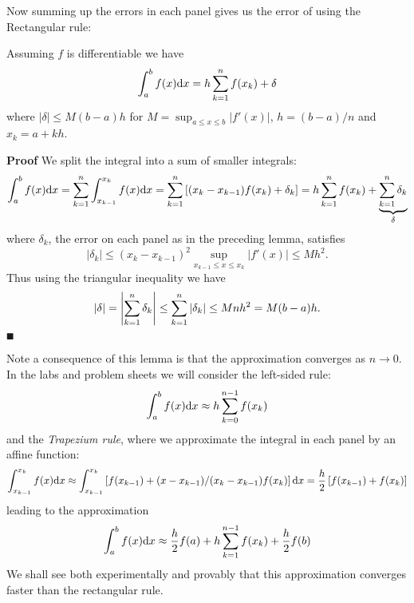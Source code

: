 Now summing up the errors in each panel gives us the error of using the Rectangular rule:

\begin{theorem} Assuming $f$ is differentiable we have
\[
\ensuremath{\int}_a^b f(x) {\rm d}x =  h \ensuremath{\sum}_{k=1}^n f(x_k) +  \ensuremath{\delta}
\]
where $|\ensuremath{\delta}| \ensuremath{\leq} M (b-a) h$ for $M = \sup_{a \ensuremath{\leq} x \ensuremath{\leq} b}|f'(x)|$, $h = (b-a)/n$ and $x_k = a + kh$. 

\end{theorem}
\textbf{Proof} We split the integral into a sum of smaller integrals:
\[
\ensuremath{\int}_a^b f(x) {\rm d}x = \ensuremath{\sum}_{k=1}^n  \ensuremath{\int}_{x_{k-1}}^{x_k} f(x) {\rm d}x =
\ensuremath{\sum}_{k=1}^n  \br[(x_k - x_{k-1}) f(x_k) + \ensuremath{\delta}_k] =  h \ensuremath{\sum}_{k=1}^n f(x_k) +  \underbrace{\ensuremath{\sum}_{k=1}^n \ensuremath{\delta}_k}_\ensuremath{\delta}
\]
where $\ensuremath{\delta}_k$, the error on each panel as in the preceding lemma, satisfies 
\[
|\ensuremath{\delta}_k| \ensuremath{\leq} (x_k-x_{k-1})^2 \sup_{x_{k-1} \ensuremath{\leq} x \ensuremath{\leq} x_k}|f'(x)| \ensuremath{\leq} M h^2.
\]
Thus using the triangular inequality we have 
\[
|\delta| = \left|{ \sum_{k=1}^n \delta_k}\right| \leq \sum_{k=1}^n |\delta_k| \leq M n h^2 = M(b-a)h.
\]
\ensuremath{\QED}

Note a consequence of this lemma is that the approximation converges as $n \ensuremath{\rightarrow} 0$. In the labs and problem sheets we will consider the left-sided rule:
\[
\ensuremath{\int}_a^b f(x) {\rm d}x \ensuremath{\approx}  h \ensuremath{\sum}_{k=0}^{n-1} f(x_k)
\]
and the \emph{Trapezium rule}, where we approximate the integral in each panel by an affine function:
\[
\ensuremath{\int}_{x_{k-1}}^{x_k} f(x) {\rm d} x \ensuremath{\approx} \ensuremath{\int}_{x_{k-1}}^{x_k} \br[f(x_{k-1}) + (x-x_{k-1})/(x_k - x_{k-1}) f(x_k)] {\rm d} x
= {h \over 2} \br[f(x_{k-1}) + f(x_k)]
\]
leading to the approximation
\[
\ensuremath{\int}_a^b f(x) {\rm d}x \ensuremath{\approx}  {h \over 2} f(a) + h \ensuremath{\sum}_{k=1}^{n-1} f(x_k) + {h \over 2} f(b)
\]
We shall see both experimentally and provably that this approximation converges faster than the rectangular rule.



